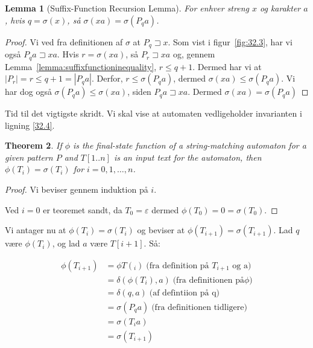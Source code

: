 \documentclass[11pt]{article}
\newtheorem{theorem}{Theorem}
\newtheorem{lemma}[theorem]{Lemma}
\theoremstyle{definition}
\theoremstyle{remark}
\begin{document}
\begin{lemma}[Suffix-Function Recursion Lemma]
\label{lemma:32.3}
For enhver streng $x$ og karakter $a$, hvis $q = \sigma(x)$, så $\sigma(xa) = \sigma(P_{q}a)$.
\end{lemma}

\begin{proof}
Vi ved fra definitionen af $\sigma$ at $P_{q} \sqsupset x$. Som vist i figur~\ref{fig:32.3}, har vi også $P_{q}a \sqsupset xa$. Hvis $r = \sigma(xa)$, så $P_r \sqsupset xa$ og, gennem Lemma~\ref{lemma:suffixfunctioninequality}, $r \leq q + 1$. Dermed har vi at $|P_{r}| = r \leq q + 1 = |P_{q}a|$. Derfor, $r \leq \sigma(P_{q}a)$, dermed $\sigma(xa) \leq \sigma(P_qa)$. Vi har dog også $\sigma (P_{q}a) \leq \sigma(xa)$, siden $P_{q}a \sqsupset xa$. Dermed $\sigma(xa) = \sigma(P_{q}a)$
\end{proof}

Tid til det vigtigste skridt. Vi skal vise at automaten vedligeholder invarianten i ligning \ref{32.4}.

\begin{theorem}
  \label{the:32.4}
  If $\phi$ is the final-state function of a string-matching automaton for a given pattern $P$ and $T[1..n]$ is an input text for the automaton, then
  $\phi(T_{i}) = \sigma(T_{i})$
  for $i = 0, 1, \ldots, n$.
\end{theorem}

\begin{proof}
  Vi beviser gennem induktion på $i$.

 Ved $i = 0$ er teoremet sandt, da $T_{0} = \varepsilon$ dermed $\phi(T_{0}) = 0 = \sigma(T_{0})$.
\end{proof}

Vi antager nu at $\phi (T_{i}) = \sigma(T_{i}) $ og beviser at $\phi(T_{i+1}) = \sigma(T_{i+1})$.
Lad $q$ være $\phi(T_{i})$, og lad $a$ være $T[i+1]$.
Så:

\begin{equation*}
  \begin{split}
    \phi(T_{i+1}) &= \phi T(_{i}) \; \text{(fra definition på } T_{i+1}  \text{ og } \text{a})\\
               &= \delta(\phi (T_{i}), a) \; \text{(fra definitionen på} \phi \text{)}\\
               &= \delta(q,a) \; \text{(af defintiion på q)}\\
               &= \sigma(P_{q}a) \; \text{(fra definitionen tidligere)}\\
               &= \sigma(T_{i}a)\\
               &= \sigma(T_{i+1})\\
  \end{split}
\end{equation*}
\end{document}
